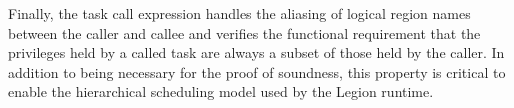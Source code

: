 Finally, the task call expression handles the aliasing of logical region names between the caller and callee and
verifies the functional requirement that the privileges held by a called task are always a subset of those held
by the caller.  In addition to being necessary for the proof of soundness, this property is critical to
enable the hierarchical scheduling model used by the Legion runtime.

\begin{comment}
\begin{figure*}
\centering{
\framebox{$\typeenv{bv}{bool}$}
\framebox{$\typeenv{iv}{int}$}
\finfrule
{\begin{array}{l}
\typeenvx e_1 : T_1 \\
\typeenvx e_2 : T_2
\end{array}}
{\typeenvx \langle e_1, e_2 \rangle : \langle T_1, T_2 \rangle}
\finfrule{\typeenvx e : \langle T_1,T_2 \rangle}{\typeenvx e\text{.1}\ : T_1}
\finfrule{\typeenvx e : \langle T_1,T_2 \rangle}{\typeenvx e\text{.2}\ : T_2}
\finfrule{\Gamma(id) = T}{\typeenvx id : T}
\framebox{$\typeenvx \text{null }T@r : T@r$}
\framebox{$\typeenvx \text{new }T@r : T@r$}
\finfrule{\typeenvx e : T@(\oton{r})}{\typeenvx \text{isnull}(e) : bool}
\finfrule
{\begin{array}{l}
\typeenvx e : T@(r'_1, \ldots r'_k) \\
\forall i. \exists j, r'_i \leq r_j \in \Omega^* \\
\end{array}}
{\typeenvx upregion(e,\oton{r}) : T@(\oton{r})}
\finfrule
{\begin{array}{l}
\typeenvx e : T@(r'_1, \ldots r'_k) \\
\forall j. \exists i, r_j \leq r'_i \in \Omega^* \\
\end{array}}
{\typeenvx downregion(e,\oton{r}) : T@(\oton{r})}
\finfrule
{\begin{array}{l}
\typeenvx e_1 : T@(\oton{r}) \\
\forall i, reads(r_i) \in \Phi^*\end{array}}
{\typeenvx \text{read}(e_1) : T}
\finfrule
{\begin{array}{l}
\typeenvx e_1 : T@(\oton{r}) \\
\typeenvx e_2 : T \\
\forall i, writes(r_i) \in \Phi^*
\end{array}}
{\typeenvx \text{write}(e_1, e_2) : T@(\oton{r})}
\finfrule
{\begin{array}{l}

\end{comment}
